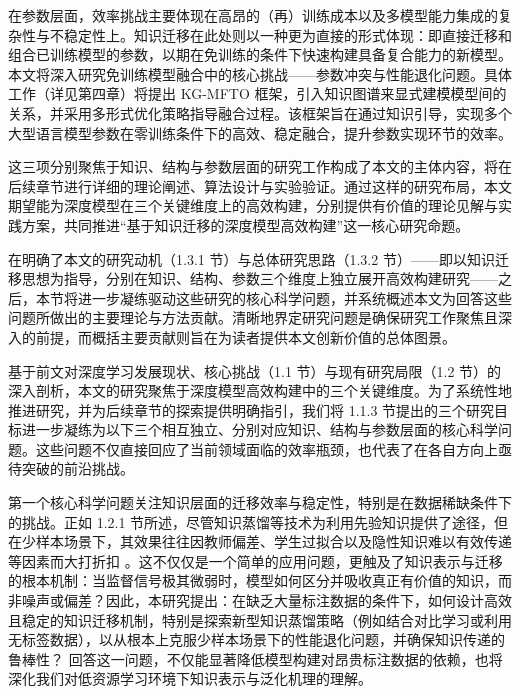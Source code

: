 \documentclass[../main.tex]{subfiles}
\begin{document}
在参数层面，效率挑战主要体现在高昂的（再）训练成本以及多模型能力集成的复杂性与不稳定性上。知识迁移在此处则以一种更为直接的形式体现：即直接迁移和组合已训练模型的参数，以期在免训练的条件下快速构建具备复合能力的新模型。本文将深入研究免训练模型融合中的核心挑战——参数冲突与性能退化问题。具体工作（详见第四章）将提出 KG-MFTO 框架，引入知识图谱来显式建模模型间的关系，并采用多形式优化策略指导融合过程。该框架旨在通过知识引导，实现多个大型语言模型参数在零训练条件下的高效、稳定融合，提升参数实现环节的效率。

这三项分别聚焦于知识、结构与参数层面的研究工作构成了本文的主体内容，将在后续章节进行详细的理论阐述、算法设计与实验验证。通过这样的研究布局，本文期望能为深度模型在三个关键维度上的高效构建，分别提供有价值的理论见解与实践方案，共同推进“基于知识迁移的深度模型高效构建”这一核心研究命题。

\label{sec:ch1-4-core-questions-and-contributions}

在明确了本文的研究动机（1.3.1 节）与总体研究思路（1.3.2 节）——即以知识迁移思想为指导，分别在知识、结构、参数三个维度上独立展开高效构建研究——之后，本节将进一步凝练驱动这些研究的核心科学问题，并系统概述本文为回答这些问题所做出的主要理论与方法贡献。清晰地界定研究问题是确保研究工作聚焦且深入的前提，而概括主要贡献则旨在为读者提供本文创新价值的总体图景。

\label{sec:ch1-4-1-core-scientific-question}

基于前文对深度学习发展现状、核心挑战（1.1 节）与现有研究局限（1.2 节）的深入剖析，本文的研究聚焦于深度模型高效构建中的三个关键维度。为了系统性地推进研究，并为后续章节的探索提供明确指引，我们将 1.1.3 节提出的三个研究目标进一步凝练为以下三个相互独立、分别对应知识、结构与参数层面的核心科学问题。这些问题不仅直接回应了当前领域面临的效率瓶颈，也代表了在各自方向上亟待突破的前沿挑战。

第一个核心科学问题关注知识层面的迁移效率与稳定性，特别是在数据稀缺条件下的挑战。正如 1.2.1 节所述，尽管知识蒸馏等技术为利用先验知识提供了途径，但在少样本场景下，其效果往往因教师偏差、学生过拟合以及隐性知识难以有效传递等因素而大打折扣 。这不仅仅是一个简单的应用问题，更触及了知识表示与迁移的根本机制：当监督信号极其微弱时，模型如何区分并吸收真正有价值的知识，而非噪声或偏差？因此，本研究提出：在缺乏大量标注数据的条件下，如何设计高效且稳定的知识迁移机制，特别是探索新型知识蒸馏策略（例如结合对比学习或利用无标签数据），以从根本上克服少样本场景下的性能退化问题，并确保知识传递的鲁棒性？ 回答这一问题，不仅能显著降低模型构建对昂贵标注数据的依赖，也将深化我们对低资源学习环境下知识表示与泛化机理的理解。
\end{document}
